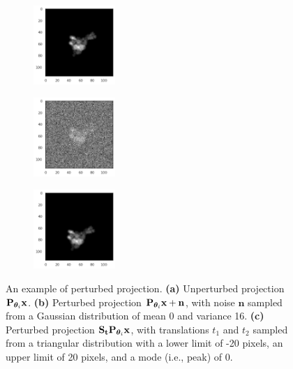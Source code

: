 \begin{figure}[ht!]
    \centering
    \begin{subfigure}[b]{0.24\textwidth}
        \includegraphics[height=3cm]{figures/5j0n_noise0}
        \caption{}
    \end{subfigure}
    \begin{subfigure}[b]{0.24\textwidth}
    \centering
        \includegraphics[height=3cm]{figures/5j0n_noise16}
        \caption{}
    \end{subfigure}
    \begin{subfigure}[b]{0.24\textwidth}
    \centering
        \includegraphics[height=3cm]{figures/5j0n_translated}
        \caption{}
    \end{subfigure}
    
    \caption{%
        An example of perturbed projection.
        \textbf{(a)} Unperturbed projection $\mathbf{P}_{{\boldsymbol{\theta}}_i} \mathbf{x}$.
        \textbf{(b)} Perturbed projection $\mathbf{P}_{{\boldsymbol{\theta}}_i} \mathbf{x} + \mathbf{n}$, with noise $\mathbf{n}$ sampled from a Gaussian distribution of mean 0 and variance 16.
        \textbf{(c)} Perturbed projection $\mathbf{S}_{\mathbf{t}} \mathbf{P}_{{\boldsymbol{\theta}}_i} \mathbf{x}$, with translations $t_1$ and $t_2$ sampled from a triangular distribution with a lower limit of -20 pixels, an upper limit of 20 pixels, and a mode (i.e., peak) of 0.
    }\label{fig:different-projections}
\end{figure}

